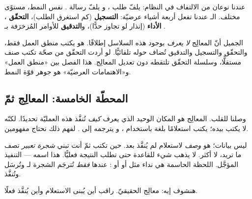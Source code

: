 \begin{keyp}
عندنا نوعان من الالتفاف في النظام:  يلفّ طلب ،
و يلفّ رسالة . نفس النمط، مستوًى مختلف. الـ 
عندنا تفعل أربعة أشياء عرضيّة: \textbf{التسجيل} (كم استغرق الطلب)،
\textbf{التحقّق} ، \textbf{الأداء} (إنذار لو تجاوز حدًّا)،
و\textbf{التدقيق}  للأوامر المُزخرَفة بـ \code{[Auditable]}.
\end{keyp}

الجميل أنّ المعالِج \emph{لا يعرف} بوجود هذه السلاسل إطلاقًا. هو يكتب منطق العمل فقط،
والتحقّق والتسجيل والتدقيق تُضاف حوله تلقائيًّا. لو أردت التحقّق من صحّة
 تكتب صنف  مستقلًّا، وسلسلة التحقّق تلتقطه
دون تعديل المعالِج. هذا الفصل بين «منطق العمل» و«الاهتمامات العرضيّة» هو جوهر قوّة
النمط.

\subsection{المحطّة الخامسة: المعالِج ثمّ }

وصلنا للقلب. المعالِج  هو المكان الوحيد الذي يعرف \emph{كيف} تُنفَّذ هذه
العمليّة تحديدًا. لكنّه لا يكتب  بيده؛ يكتب استعلامًا بلغة  باستخدام
، و يترجمه إلى . لفهم ذلك نحتاج مفهومين.

\begin{idea}
 ليس بيانات؛ هو \emph{وصف} لاستعلام لم يُنفَّذ بعد. حين تكتب
 ثمّ  أنت تبني \emph{شجرة تعبير} تصف ما تريد،
لا أكثر. لا يذهب شيء للقاعدة حتى تطلب النتيجة فعليًّا. هذا اسمه  — التنفيذ المؤجَّل. اللحظة الحاسمة هي نداء مثل  أو
 أو : عندها \emph{فقط} تُترجَم الشجرة
لـ  وتُرسَل وتُنفَّذ.
\end{idea}

هنشوف إيه: معالِج  الحقيقيّ. راقب أين يُبنى الاستعلام
وأين يُنفَّذ فعلًا.


